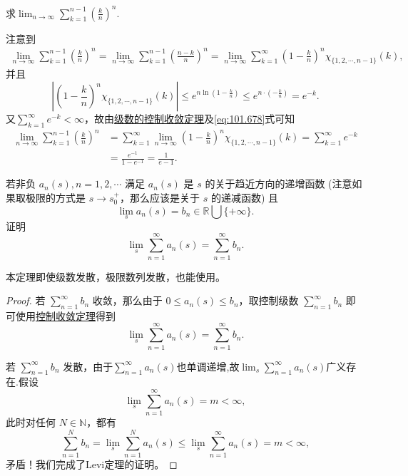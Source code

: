 \documentclass[../../main.tex]{subfiles}
\begin{document}
\begin{example}
求$\lim_{n\rightarrow \infty}\sum_{k=1}^{n-1}\left( \frac{k}{n} \right) ^n$.
\end{example}
\begin{solution}
注意到
\begin{align}
\lim_{n\rightarrow \infty}\sum_{k=1}^{n-1}\left( \frac{k}{n} \right) ^n=\lim_{n\rightarrow \infty}\sum_{k=1}^{n-1}\left( \frac{n-k}{n} \right) ^n\nonumber=\lim_{n\rightarrow \infty}\sum_{k=1}^{\infty}\left( 1-\frac{k}{n} \right) ^n\chi _{\{1,2,\cdots ,n-1\}}(k),\label{eq:101.678}
\end{align}
并且
\[
\left| \left( 1-\frac{k}{n} \right) ^n\chi _{\{1,2,\cdots ,n-1\}}(k) \right|\leqslant e^{n\ln \left( 1-\frac{k}{n} \right)}\leqslant e^{n\cdot \left( -\frac{k}{n} \right)}=e^{-k}.
\]
又$\sum_{k=1}^{\infty}e^{-k}<\infty$，故由\hyperref[theorem:级数的控制收敛定理]{级数的控制收敛定理}及\eqref{eq:101.678}式可知
\begin{align*}
\lim_{n\rightarrow \infty}\sum_{k=1}^{n-1}\left( \frac{k}{n} \right) ^n&=\sum_{k=1}^{\infty}\lim_{n\rightarrow \infty}\left( 1-\frac{k}{n} \right) ^n\chi _{\{1,2,\cdots ,n-1\}}(k)=\sum_{k=1}^{\infty}e^{-k}
\\
&=\frac{e^{-1}}{1-e^{-1}}=\frac{1}{e-1}.
\end{align*}
\end{solution}

\begin{theorem}[级数的Levi定理]\label{theorem:级数的Levi定理}
若非负 \( a_n(s), n = 1, 2, \cdots \) 满足 \( a_n(s) \) 是 \( s \) 的关于趋近方向的递增函数 (注意如果取极限的方式是 \( s \to s_0^+ \)，那么应该是关于 \( s \) 的递减函数) 且
\[
\lim_{s} a_n(s) = b_n \in \mathbb{R} \bigcup \{+\infty\}.
\]
证明
\[
\lim_{s} \sum_{n = 1}^{\infty} a_n(s) = \sum_{n = 1}^{\infty} b_n.
\]
\end{theorem}
\begin{note}
本定理即使级数发散，极限数列发散，也能使用。
\end{note}
\begin{proof}
若 \( \sum_{n = 1}^{\infty} b_n \) 收敛，那么由于 \( 0 \leqslant a_n(s) \leqslant b_n \)，取控制级数 \( \sum_{n = 1}^{\infty} b_n \) 即可使用\hyperref[theorem:级数的控制收敛定理]{控制收敛定理}得到
\[
\lim_{s} \sum_{n = 1}^{\infty} a_n(s) = \sum_{n = 1}^{\infty} b_n.
\]

若 \( \sum_{n = 1}^{\infty} b_n \) 发散，由于$\sum_{n = 1}^{\infty} a_n(s)$也单调递增,故$\lim_{s} \sum_{n = 1}^{\infty} a_n(s) $广义存在.假设
\[
\lim_{s} \sum_{n = 1}^{\infty} a_n(s) = m < \infty,
\]
此时对任何 \( N \in \mathbb{N} \)，都有
\[
\sum_{n = 1}^{N} b_n = \lim_{s} \sum_{n = 1}^{N} a_n(s) \leqslant \lim_{s} \sum_{n = 1}^{\infty} a_n(s) = m < \infty,
\]
矛盾！我们完成了Levi定理的证明。
\end{proof}
\end{document}

